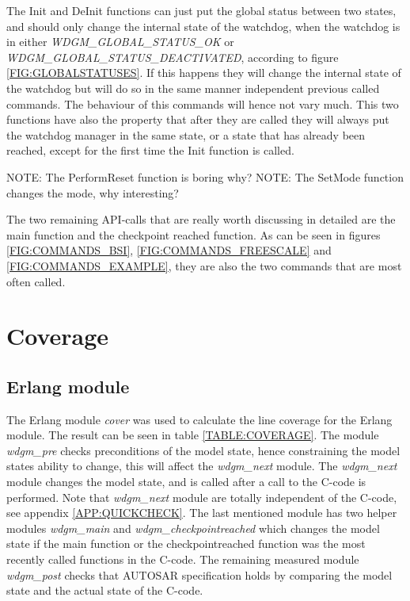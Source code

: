 The Init and DeInit functions can just put the global
status between two states, and should only change the internal state of the
watchdog, when the watchdog is in either \emph{WDGM\_GLOBAL\_STATUS\_OK}
or \emph{WDGM\_GLOBAL\_STATUS\_DEACTIVATED}, according to
figure \ref{FIG:GLOBALSTATUSES}. If this happens they will change the internal
state of the watchdog but will do so in the same manner independent previous
called commands. The behaviour of this commands will hence not vary much.
This two functions have also the property that after they are called they will
always put the watchdog manager in the same state, or a state that has already
been reached, except for the first time the Init function is called.

NOTE: The PerformReset function is boring why?
NOTE: The SetMode function changes the mode, why interesting?

The two remaining API-calls that are really worth discussing in detailed are the
main function and the checkpoint reached function. As can be seen in
figures \ref{FIG:COMMANDS_BSI}, \ref{FIG:COMMANDS_FREESCALE} and
\ref{FIG:COMMANDS_EXAMPLE}, they are also the two commands that are most
often called.

\section{Coverage}
\subsection{Erlang module}
\newcommand{\linecoverage}{100\%}
The Erlang module \emph{cover} was used to calculate the line coverage for the
Erlang module. The result can be seen in table \ref{TABLE:COVERAGE}.
The module \emph{wdgm\_pre} checks preconditions of the model state, hence
constraining the model states ability to change, this will affect the
\emph{wdgm\_next} module. The \emph{wdgm\_next} module changes the model state,
and is called after a call to the C-code is performed. Note that
\emph{wdgm\_next} module are totally independent of the C-code, see appendix
\ref{APP:QUICKCHECK}. The last mentioned module has two helper modules
\emph{wdgm\_main} and \emph{wdgm\_checkpointreached} which changes the model
state if the main function or the checkpointreached function was the most
recently called functions in the C-code. The remaining measured module \emph{wdgm\_post} checks
that AUTOSAR specification holds by comparing the model state and the actual
state of the C-code.

